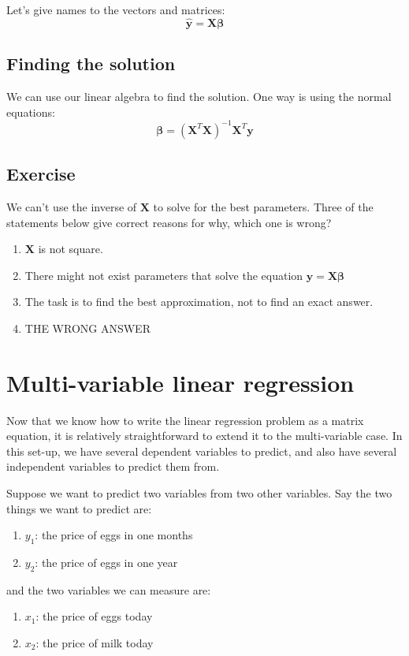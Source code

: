 \documentclass[11pt]{article}
\newcommand\xmtx{\boldsymbol{X}}
\newcommand\betavec{\boldsymbol{\beta}}
\newcommand\yvec{\boldsymbol{y}}
\newcommand\yhatvec{\boldsymbol{\hat{y}}}
\begin{document}
Let's give names to the vectors and matrices:
\begin{equation}
    \yhatvec = \xmtx \betavec
\end{equation}

\subsection{Finding the solution}

We can use our linear algebra to find the solution. One way is using the normal equations:
\begin{equation}
    \betavec = (\xmtx^T \xmtx)^{-1} \xmtx^T \yvec
\end{equation}

\subsection{ Exercise }

We can't use the inverse of $\xmtx$ to solve for the best parameters.
Three of the statements below give correct reasons for why, which one is
wrong?

\begin{enumerate}
    \item $\xmtx$ is not square.
    \item There might not exist parameters that solve the equation
        $\yvec = \xmtx \betavec$
    \item The task is to find the best approximation, not to find an
        exact answer.
    \item THE WRONG ANSWER
\end{enumerate}

\section{ Multi-variable linear regression }

Now that we know how to write the linear regression problem as a matrix
equation, it is relatively straightforward to extend it to the
multi-variable case. In this set-up, we have several dependent variables to
predict, and also have several independent variables to predict them
from.

Suppose we want to predict two variables from two other variables.
Say the two things we want to predict are:
\begin{enumerate}
    \item $y_1$: the price of eggs in one months
    \item $y_2$: the price of eggs in one year
\end{enumerate}
and the two variables we can measure are:
\begin{enumerate}
    \item $x_1$: the price of eggs today
    \item $x_2$: the price of milk today
\end{enumerate}
\end{document}
